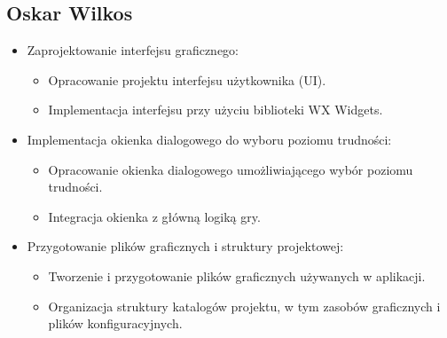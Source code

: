 \documentclass[]{article}
\begin{document}
\subsection{Oskar Wilkos}
\begin{itemize}
	\item Zaprojektowanie interfejsu graficznego:
	\begin{itemize}
		\item Opracowanie projektu interfejsu użytkownika (UI).
		\item Implementacja interfejsu przy użyciu biblioteki WX Widgets.
	\end{itemize}
	\item Implementacja okienka dialogowego do wyboru poziomu trudności:
	\begin{itemize}
		\item Opracowanie okienka dialogowego umożliwiającego wybór poziomu trudności.
		\item Integracja okienka z główną logiką gry.
	\end{itemize}
	\item Przygotowanie plików graficznych i struktury projektowej:
	\begin{itemize}
		\item Tworzenie i przygotowanie plików graficznych używanych w aplikacji.
		\item Organizacja struktury katalogów projektu, w tym zasobów graficznych i plików konfiguracyjnych.
	\end{itemize}
\end{itemize}
	
	
\end{document}
